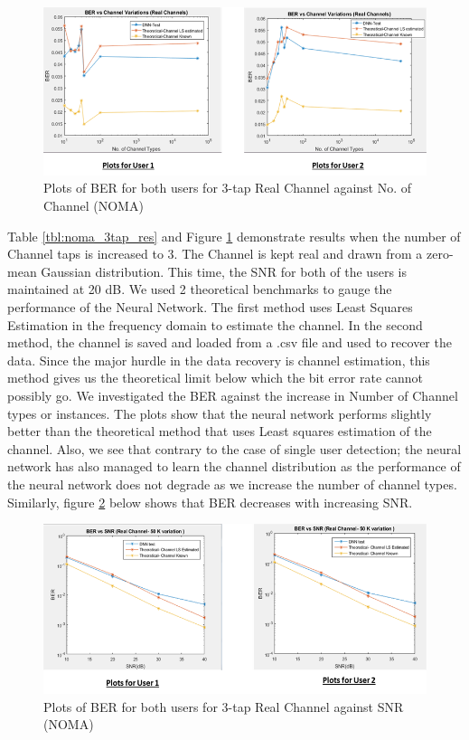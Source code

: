 \begin{figure}[htbp]
  \centering
  \includegraphics[width=\textwidth]{./Figures/noma_comp.png}
  \caption{Plots of BER for both users for 3-tap Real Channel against No. of Channel (NOMA)}
  \label{fig:noma_comp}
\end{figure}
Table \ref{tbl:noma_3tap_res} and Figure \ref{fig:noma_comp} demonstrate results when the number of Channel taps is increased to 3. The Channel is kept real and drawn from a zero-mean Gaussian distribution. This time, the SNR for both of the users is maintained at 20 dB. We used 2 theoretical benchmarks to gauge the performance of the Neural Network. The first method uses Least Squares Estimation in the frequency domain to estimate the channel. In the second method, the channel is saved and loaded from a .csv file and used to recover the data. Since the major hurdle in the data recovery is channel estimation, this method gives us the theoretical limit below which the bit error rate cannot possibly go. We investigated the BER against the increase in Number of Channel types or instances. The plots show that the neural network performs slightly better than the theoretical method that uses Least squares estimation of the channel. Also, we see that contrary to the case of single user detection; the neural network has also managed to learn the channel distribution as the performance of the neural network does not degrade as we increase the number of channel types. Similarly, figure \ref{fig:noma_3tap_snr} below shows that BER decreases with increasing SNR.\\
\begin{figure}[htbp]
  \centering
  \includegraphics[width=\textwidth]{./Figures/noma_3tap_snr.png}
  \caption{Plots of BER for both users for 3-tap Real Channel against SNR (NOMA)}
  \label{fig:noma_3tap_snr}
\end{figure}
